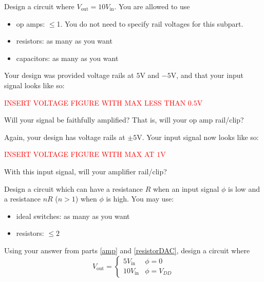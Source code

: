 
\begin{enumerate}
\qitem\label{amp}{
	Design a circuit where $V_\text{out} = 10V_\text{in}$. You are allowed to use
	\begin{itemize}
		\item op amps: $\leq$1. You do not need to specify rail voltages for this subpart.
		\item resistors: as many as you want
		\item capacitors: as many as you want
	\end{itemize}
}

\qitem\label{no_rail}{
	Your design was provided voltage rails at $5\si{\volt}$ and $-5\si{\volt}$, and that your input signal looks like so:
	\begin{center}
		\textcolor{red}{INSERT VOLTAGE FIGURE WITH MAX LESS THAN $0.5\si{\volt}$}
	\end{center}
	Will your signal be faithfully amplified? That is, will your op amp rail/clip?
}
\empt{\vspace{2cm}}

\qitem\label{yes_rail}{
	Again, your design has voltage rails at $\pm 5\si{\volt}$. Your input signal now looks like so:
	\begin{center}
		\textcolor{red}{INSERT VOLTAGE FIGURE WITH MAX AT $1\si{\volt}$}
	\end{center}
	With this input signal, will your amplifier rail/clip?
}
\empt{\vspace{2cm}}

\qitem\label{resistorDAC}{
	Design a circuit which can have a resistance $R$ when an input signal $\phi$ is low and a resistance $nR$ ($n > 1$) when $\phi$ is high. You may use:
	\begin{itemize}
		\item ideal switches: as many as you want
		\item resistors: $\leq 2$
	\end{itemize}
}
\empt{\vspace{4cm}}

\qitem\label{vga}{
	Using your answer from parts \ref{amp} and \ref{resistorDAC}, design a circuit where
	$$V_\text{out} = \begin{cases}
						5V_\text{in} & \phi = 0\\
						10V_\text{in} & \phi = V_{DD}
					\end{cases}$$
}
\empt{
	\vspace{2cm}

}
\end{enumerate}
